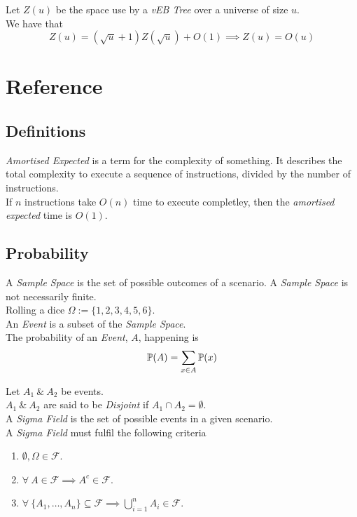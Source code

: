 \documentclass[11pt,a4paper]{article}
\begin{document}
Let $Z(u)$ be the space use by a \textit{vEB Tree} over a universe of size $u$.\\
We have that
$$Z(u)=(\sqrt{u}+1)Z(\sqrt{u})+O(1)\implies Z(u)=O(u)$$

\newpage
\setcounter{section}{-1}
\section{Reference}

\subsection{Definitions}

\textit{Amortised Expected} is a term for the complexity of something. It describes the total complexity to execute a sequence of instructions, divided by the number of instructions.\\
\eg If $n$ instructions take $O(n)$ time to execute completley, then the \textit{amortised expected} time is $O(1)$.

\subsection{Probability}

A \textit{Sample Space} is the set of possible outcomes of a scenario. A \textit{Sample Space} is not necessarily finite.\\
\eg Rolling a dice $\Omega:=\{1,2,3,4,5,6\}$.\\

An \textit{Event} is a subset of the \textit{Sample Space}.\\
The probability of an \textit{Event}, $A$, happening is
$$\mathbb{P}(A)=\sum_{x\in A}\mathbb{P}(x)$$

Let $A_1\ \&\ A_2$ be events.\\
$A_1\ \&\ A_2$ are said to be \textit{Disjoint} if $A_1\cap A_2=\emptyset$.\\

A \textit{Sigma Field} is the set of possible events in a given scenario.\\
A \textit{Sigma Field} must fulfil the following criteria
\begin{enumerate}
	\item $\emptyset,\Omega\in\mathcal{F}$.
	\item $\forall\ A\in\mathcal{F}\implies A^c\in\mathcal{F}$.
	\item $\forall\ \{A_1,\dots,A_n\}\subseteq\mathcal{F}\implies\bigcup\limits_{i=1}^nA_i\in\mathcal{F}$.
\end{enumerate}
\end{document}
